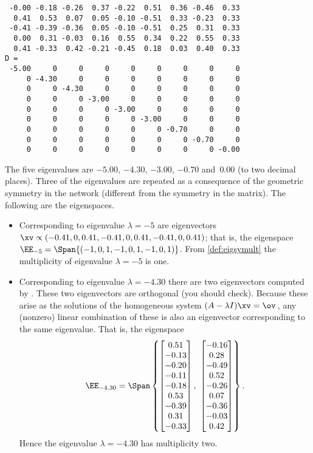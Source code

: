 \begin{example}
\begin{solution}
{\begin{verbatim}
 -0.00 -0.18 -0.26  0.37 -0.22  0.51  0.36 -0.46  0.33
  0.41  0.53  0.07  0.05 -0.10 -0.51  0.33 -0.23  0.33
 -0.41 -0.39 -0.36  0.05 -0.10 -0.51  0.25  0.31  0.33
  0.00  0.31 -0.03  0.16  0.55  0.34  0.22  0.55  0.33
  0.41 -0.33  0.42 -0.21 -0.45  0.18  0.03  0.40  0.33
D =
 -5.00     0     0     0     0     0     0     0     0
     0 -4.30     0     0     0     0     0     0     0
     0     0 -4.30     0     0     0     0     0     0
     0     0     0 -3.00     0     0     0     0     0
     0     0     0     0 -3.00     0     0     0     0
     0     0     0     0     0 -3.00     0     0     0
     0     0     0     0     0     0 -0.70     0     0
     0     0     0     0     0     0     0 -0.70     0
     0     0     0     0     0     0     0     0 -0.00
\end{verbatim}
}%
The five eigenvalues are \(-5.00\), \(-4.30\), \(-3.00\), \(-0.70\) and~\(0.00\) (to two decimal places).
Three of the eigenvalues are repeated as a consequence of the geometric symmetry in the network (different from the symmetry in the matrix).
The following are the eigenspaces.
\begin{itemize}
\item Corresponding to eigenvalue \(\lambda=-5\) are eigenvectors \(\xv\propto(-0.41,0,0.41,-0.41,0,0.41,-0.41,0,0.41)\); that is, the eigenspace \(\EE_{-5}=\Span\{(-1,0,1,-1,0,1,-1,0,1)\}\).
From \autoref{def:eigsymult} the multiplicity of eigenvalue \(\lambda=-5\) is one.

\item Corresponding to eigenvalue \(\lambda=-4.30\) there are two eigenvectors computed by \script.
These two eigenvectors are orthogonal (you should check).
Because these arise as the solutions of the homogeneous system \((A-\lambda I)\xv=\ov\)\,, any (nonzero) linear combination of these is also an eigenvector corresponding to the same eigenvalue. 
That is, the eigenspace
\begin{equation*}
\EE_{-4.30}=\Span\left\{ \begin{bmatrix} 0.51\\-0.13\\-0.20\\-0.11\\-0.18\\0.53\\-0.39\\0.31\\-0.33 \end{bmatrix},\  \begin{bmatrix} -0.16\\0.28\\-0.49\\0.52\\-0.26\\0.07\\-0.36\\-0.03\\0.42 \end{bmatrix} \right\}.
\end{equation*}
Hence the eigenvalue \(\lambda=-4.30\) has multiplicity two.


\end{itemize}
\end{solution}
\end{example}
